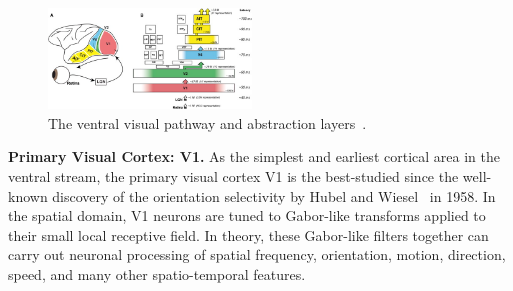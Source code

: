 \documentclass[journal]{journal}
\begin{document}
\begin{figure}[b!]
	\centering
	\includegraphics[width=0.48\textwidth]{pics/ventral.jpg}
	\caption{The ventral visual pathway and abstraction layers~\cite{dicarlo2012does}.
}
	\label{Fig:Ventral}
\end{figure}
\textbf{Primary Visual Cortex: V1.}
As the simplest and earliest cortical area in the ventral stream, the primary visual cortex V1 is the best-studied since the well-known discovery of the orientation selectivity by Hubel and Wiesel~\cite{hubel1959receptive} in 1958.
In the spatial domain, V1 neurons are tuned to Gabor-like transforms applied to their small local receptive field.
In theory, these Gabor-like filters together can carry out neuronal processing of spatial frequency, orientation, motion, direction, speed, and many other spatio-temporal features.
\end{document}
